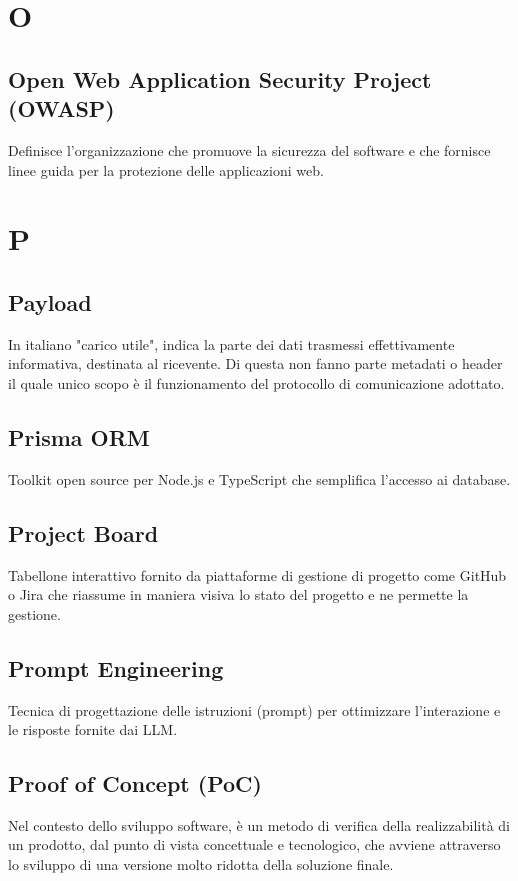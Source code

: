 \documentclass[10pt, letterpaper]{article}
\begin{document}
\section{O}

\subsection*{Open Web Application Security Project (OWASP)}
Definisce l'organizzazione che promuove la sicurezza del software e che fornisce linee guida per la protezione delle applicazioni web.

\section{P}

\subsection*{Payload}
In italiano "carico utile", indica la parte dei dati trasmessi effettivamente informativa, destinata al ricevente. Di questa non fanno parte metadati o header il quale unico scopo è il funzionamento del protocollo di comunicazione adottato.


\subsection*{Prisma ORM}
Toolkit open source per Node.js e TypeScript che semplifica l'accesso ai database.

\subsection*{Project Board}
Tabellone interattivo fornito da piattaforme di gestione di progetto come GitHub o Jira che riassume in maniera visiva lo stato del progetto e ne permette
la gestione.

\subsection*{Prompt Engineering}
Tecnica di progettazione delle istruzioni (prompt) per ottimizzare l'interazione e le risposte fornite dai LLM.

\subsection*{Proof of Concept (PoC)}
Nel contesto dello sviluppo software, è un metodo di verifica della realizzabilità di un prodotto, dal punto di vista concettuale e tecnologico, che avviene
attraverso lo sviluppo di una versione molto ridotta della soluzione finale.
\end{document}
